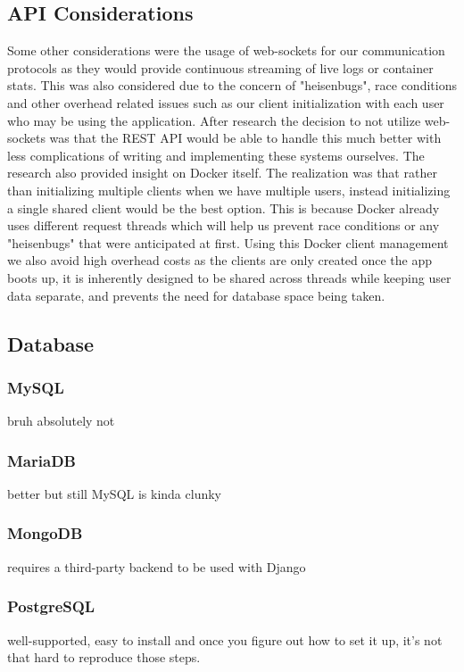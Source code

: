 \documentclass[12pt]{article}
\begin{document}
\subsection{API Considerations}
Some other considerations were the usage of web-sockets for our communication protocols as they would provide continuous streaming of live logs or container stats. This was also considered due to the concern of "heisenbugs", race conditions and other overhead related issues such as our client initialization with each user who may be using the application. After research the decision to not utilize web-sockets was that the REST API would be able to handle this much better with less complications of writing and implementing these systems ourselves. The research also provided insight on Docker itself. The realization was that rather than initializing multiple clients when we have multiple users, instead initializing a single shared client would be the best option. This is because Docker already uses different request threads which will help us prevent race conditions or any "heisenbugs" that were anticipated at first. Using this Docker client management we also avoid high overhead costs as the clients are only created once the app boots up, it is inherently designed to be shared across threads while keeping user data separate, and prevents the need for database space being taken.

\subsection{Database}

\subsubsection{MySQL}
bruh absolutely not

\subsubsection{MariaDB}
better but still MySQL is kinda clunky

\subsubsection{MongoDB}
requires a third-party backend to be used with Django

\subsubsection{PostgreSQL}
well-supported, easy to install and once you figure out how to set it up, it's not that hard to reproduce those steps.
\end{document}
